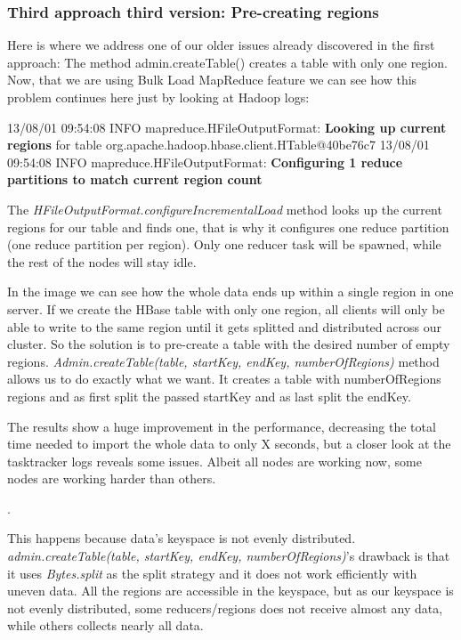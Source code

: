 \subsubsection{Third approach third version: Pre-creating regions}
Here is where we address one of our older issues already discovered in the first approach: The method admin.createTable() creates a table with only one region. Now, that we are using Bulk Load MapReduce feature we can see how this problem continues here just by looking at Hadoop logs:
\par
13/08/01 09:54:08 INFO mapreduce.HFileOutputFormat: \textbf{Looking up current regions} for table org.apache.hadoop.hbase.client.HTable@40be76c7
13/08/01 09:54:08 INFO mapreduce.HFileOutputFormat: \textbf{Configuring 1 reduce partitions to match current region count}
\par
The \textit{HFileOutputFormat.configureIncrementalLoad} method looks up the current regions for our table and finds one, that is why it configures one reduce partition (one reduce partition per region). Only one reducer task will be spawned, while the rest of the nodes will stay idle.
\par
{}
\par
In the image we can see how the whole data ends up within a single region in one server. If we create the HBase table with only one region, all clients will only be able to write to the same region until it gets splitted and distributed across our cluster. So the solution is to pre-create a table with the desired number of empty regions. \textit{Admin.createTable(table, startKey, endKey, numberOfRegions)} method allows us to do exactly what we want. It creates a table with numberOfRegions regions and as first split the passed startKey and as last split the endKey.
\par
{}
\par
The results show a huge improvement in the performance, decreasing the total time needed to import the whole data to only X seconds, but a closer look at the tasktracker logs reveals some issues. Albeit all nodes are working now, some nodes are working harder than others.
\par
 . 
\par
This happens because data's keyspace is not evenly distributed. \textit{admin.createTable(table, startKey, endKey, numberOfRegions)}'s drawback is that it uses \textit{Bytes.split} as the split strategy and it does not work efficiently with uneven data. All the regions are accessible in the keyspace, but as our keyspace is not evenly distributed, some reducers/regions does not receive almost any data, while others collects nearly all data.



